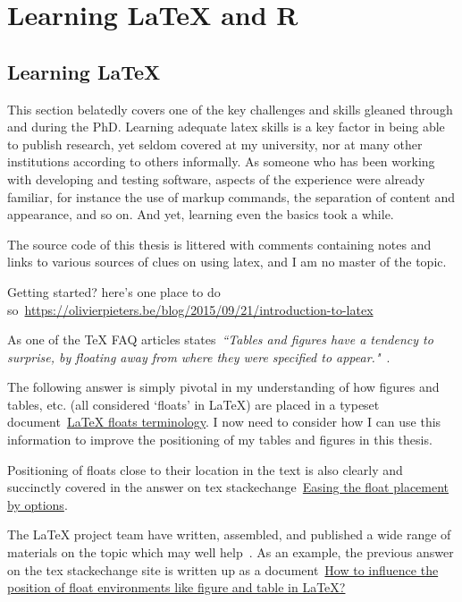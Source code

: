 \chapter{Learning LaTeX and R}


\section{Learning LaTeX}
This section belatedly covers one of the key challenges and skills gleaned through and during the PhD. Learning adequate latex skills is a key factor in being able to publish research, yet seldom covered at my university, nor at many other institutions according to others informally.
As someone who has been working with developing and testing software, aspects of the experience were already familiar, for instance the use of markup commands, the separation of content and appearance, and so on. And yet, learning even the basics took a while. 

The source code of this thesis is littered with comments containing notes and links to various sources of clues on using latex, and I am no master of the topic.

Getting started? here's one place to do so~\url{https://olivierpieters.be/blog/2015/09/21/introduction-to-latex}

As one of the TeX FAQ articles states~\emph{``Tables and figures have a tendency to surprise, by floating away from where they were specified to appear."}~\citep{texfaq_floats}.

The following answer is simply pivotal in my understanding of how figures and tables, etc. (all considered `floats' in LaTeX) are placed in a typeset document~\href{https://tex.stackexchange.com/questions/39017/how-to-influence-the-position-of-float-environments-like-figure-and-table-in-lat/39020#39020}{LaTeX floats terminology}. I now need to consider how I can use this information to improve the positioning of my tables and figures in this thesis. 

Positioning of floats close to their location in the text is also clearly and succinctly covered in the answer on tex stackechange~\href{https://tex.stackexchange.com/a/2282/88466}{Easing the float placement by options}.

The LaTeX project team have written, assembled, and published a wide range of materials on the topic which may well help~\citep{publications_by_the_LaTeX_project_team}. As an example, the previous answer on the tex stackechange site is written up as a document~\href{https://www.latex-project.org/publications/2014-FMi-TUB-tb111mitt-float-placement.pdf}{How to influence the position of float environments like figure and table in LaTeX?}

